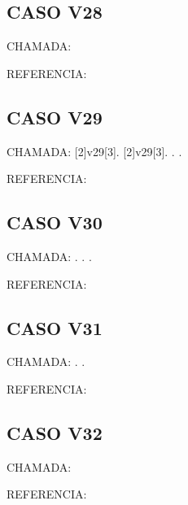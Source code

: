 \documentclass{undftex}
\begin{document}
\begin{refsection}\section*{CASO V28}\noindent CHAMADA:  \par\noindent REFERENCIA:\par\printbibliography[heading=none,check=undfconsultadas]\end{refsection}\clearpage
\begin{refsection}\section*{CASO V29}\noindent CHAMADA: [2]{v29}[3]. [2]{v29}[3]. . .\par\noindent REFERENCIA:\par\printbibliography[heading=none,check=undfconsultadas]\end{refsection}\clearpage
\begin{refsection}\section*{CASO V30}\noindent CHAMADA: . . .\par\noindent REFERENCIA:\par\printbibliography[heading=none,check=undfconsultadas]\end{refsection}\clearpage
\begin{refsection}\section*{CASO V31}\noindent CHAMADA: . .\par\noindent REFERENCIA:\par\printbibliography[heading=none,check=undfconsultadas]\end{refsection}\clearpage
\begin{refsection}\section*{CASO V32}\noindent CHAMADA:  \par\noindent REFERENCIA:\par\printbibliography[heading=none,check=undfconsultadas]\end{refsection}\clearpage
\end{document}

